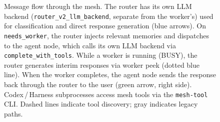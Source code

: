 \documentclass[11pt,a4paper]{article}
\newcommand{\code}[1]{\texttt{#1}}
\begin{document}
\begin{figure}[h]
\caption{Message flow through the mesh.  The router has its own LLM
backend (\code{router\_v2\_llm\_backend}, separate from the worker's)
used for classification and direct response generation (blue arrows).
On \code{needs\_worker}, the router injects relevant memories and
dispatches to the agent node, which calls its own LLM backend via
\code{complete\_with\_tools}.  While a worker is running (BUSY), the
router generates interim responses via worker peek (dotted blue line).
When the worker completes, the agent node sends the response back
through the router to the user (green arrow, right side).
Codex\,/\,Harness subprocesses access mesh tools via the
\code{mesh-tool} CLI.  Dashed lines indicate tool discovery; gray
indicates legacy paths.}
\label{fig:overview}
\end{figure}
\end{document}
